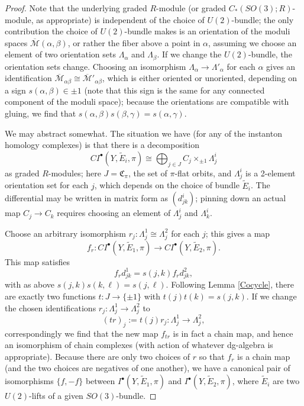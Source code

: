 \documentclass[10pt,a4paper]{amsart}
\theoremstyle{definition}
\theoremstyle{remark}
\numberwithin{figure}{qchap}
\begin{document}
\begin{proof}Note that the underlying graded $R$-module (or graded $C_*(SO(3);R)$-module, as appropriate) is independent of the choice of $U(2)$-bundle; the only contribution the choice of $U(2)$-bundle makes is an orientation of the moduli spaces $\overline{\mathcal M}(\alpha, \beta)$, or rather the fiber above a point in $\alpha$, assuming we choose an element of two orientation sets $\Lambda_\alpha$ and $\Lambda_\beta$. If we change the $U(2)$-bundle, the orientation sets change. Choosing an isomorphism $\Lambda_\alpha \to \Lambda'_\alpha$ for each $\alpha$ gives an identification $\overline{\mathcal M}_{\alpha \beta} \cong \overline{\mathcal M}'_{\alpha \beta}$, which is either oriented or unoriented, depending on a sign $s(\alpha, \beta) \in \pm 1$ (note that this sign is the same for any connected component of the moduli space); because the orientations are compatible with gluing, we find that $s(\alpha, \beta) s(\beta, \gamma) = s(\alpha, \gamma)$. 

We may abstract somewhat. The situation we have (for any of the instanton homology complexes) is that there is a decomposition 
$$CI^\bullet(Y, \tilde E_i, \pi) \cong \bigoplus_{j \in J} C_j \times_{\pm 1} \Lambda^i_j$$ as graded $R$-modules; here $J = \mathfrak C_\pi$, the set of $\pi$-flat orbits, and $\Lambda^i_j$ is a 2-element orientation set for each $j$, which depends on the choice of bundle $\tilde E_i$. The differential may be written in matrix form as $(d^i_{jk})$; pinning down an actual map $C_j \to C_k$ requires choosing an element of $\Lambda^i_j$ and $\Lambda^i_k$.

Choose an arbitrary isomorphism $r_j: \Lambda^1_j \cong \Lambda^2_j$ for each $j$; this gives a map 
$$f_r: CI^\bullet(Y, \tilde E_1, \pi) \to CI^\bullet(Y, \tilde E_2, \pi).$$
This map satisfies 
$$f_r d^1_{jk} = s(j,k)f_r d^2_{jk},$$
with as above $s(j,k) s(k,\ell) = s(j,\ell).$ Following Lemma \ref{Cocycle}, there are exactly two functions $t: J \to \{\pm 1\}$ with $t(j)t(k) = s(j,k).$ If we change the chosen identifications $r_j: \Lambda^1_j \to \Lambda^2_j$ to 
$$(tr)_j := t(j)r_j: \Lambda^1_j \to \Lambda^2_j,$$ 
correspondingly we find that the new map $f_{tr}$ is in fact a chain map, and hence an isomorphism of chain complexes (with action of whatever dg-algebra is appropriate). Because there are only two choices of $r$ so that $f_r$ is a chain map (and the two choices are negatives of one another), we have a canonical pair of isomorphisms $\{f, -f\}$ between $I^\bullet(Y,\tilde E_1, \pi)$ and $I^\bullet(Y, \tilde E_2, \pi)$, where $\tilde E_i$ are two $U(2)$-lifts of a given $SO(3)$-bundle.
\end{proof}
\end{document}
